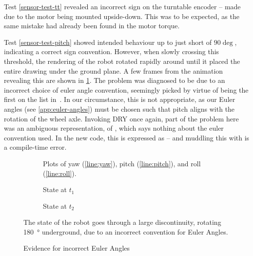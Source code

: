 \documentclass[main.tex]{subfiles}
\begin{document}
		Test \ref{sensor-test-tt} revealed an incorrect sign on the turntable encoder -- made due to the motor being mounted upside-down.
		This was to be expected, as the same mistake had already been found in the motor torque.

		Test \ref{sensor-test-pitch} showed intended behaviour up to just short of $90\deg$, indicating a correct sign convention.
		However, when slowly crossing this threshold, the rendering of the robot rotated rapidly around until it placed the entire drawing under the ground plane.
		A few frames from the animation revealing this are shown in \cref{fig:bad-euler}.
		The problem was diagnosed to be due to an incorrect choice of euler angle convention, seemingly picked by virtue of being the first on the list in~\cite{diebel2006representing}.
		In our circumstance, this is not appropriate, as our Euler angles (see \cref{app:euler-angles}) must be chosen such that pitch aligns with the rotation of the wheel axle.
		Invoking DRY once again, part of the problem here was an ambiguous representation, of , which says nothing about the euler convention used.
		In the new code, this is expressed as  -- and muddling this with  is a compile-time error.

		\begin{figure}
			\centering
			\begin{subfigure}[t]{0.333\linewidth-2em}
				
				\caption{
					Plots of yaw (\ref{line:yaw}), pitch (\ref{line:pitch}), and roll (\ref{line:roll}).
				}
			\end{subfigure}\hfill
			\begin{subfigure}[t]{0.333\linewidth-2em}
				
				\caption{State at $t_1$}
			\end{subfigure}\hfill
			\begin{subfigure}[t]{0.333\linewidth-2em}
				
				\caption{State at $t_2$}
			\end{subfigure}
			\caption{Evidence for incorrect Euler Angles}
			\label{fig:bad-euler}
			\medskip
			\small
			The state of the robot goes through a large discontinuity, rotating \SI{180}{\degree} underground, due to an incorrect convention for Euler Angles.
		\end{figure}
\end{document}
